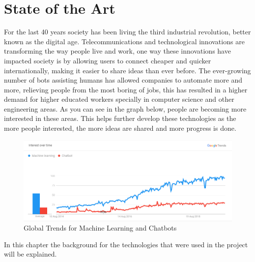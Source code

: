 \chapter{State of the Art}\label{sec:chap:2}

For the last 40 years society has been living the third industrial revolution, better known as the digital age. Telecommunications and technological innovations are transforming the way people live and work, one way these innovations have impacted society is by allowing users to connect cheaper and quicker internationally, making it easier to share ideas than ever before. 
The ever-growing number of bots assisting humans has allowed companies to automate more and more, relieving people from the most boring of jobs, this has resulted in a higher demand for higher educated workers specially in computer science and other engineering areas. 
As you can see in the graph below, people are becoming more interested in these areas. This helps further develop these technologies as the more people interested, the more ideas are shared and more progress is done.\\

\begin{center}
	\begin{figure}[h!]
		\centering
		\includegraphics[scale=0.6]{./images/3-mach-chat-trend}
		\caption{Global Trends for Machine Learning and Chatbots}
		\label{global-trends-mach-chat}
	\end{figure}
\end{center}

In this chapter the background for the technologies that were used in the project will be explained. \\

